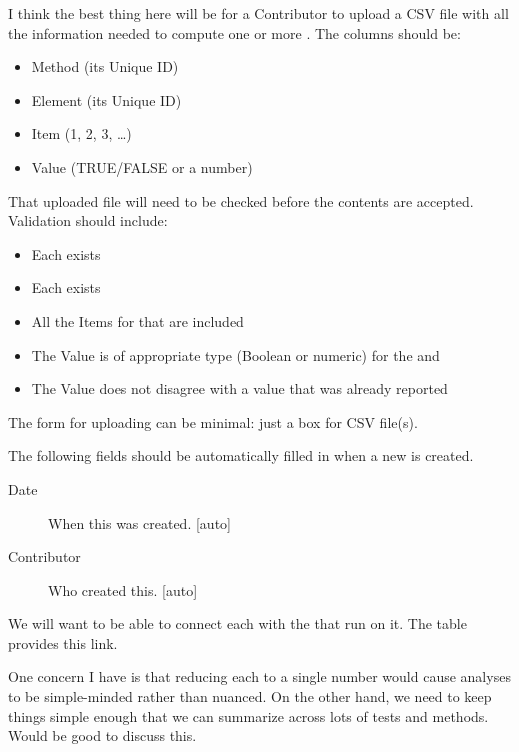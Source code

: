 I think the best thing here will be for a Contributor to upload a CSV file with all the information needed to compute one or more \Results.
The columns should be:
\begin{itemize}
    \item Method (its Unique ID)
    \item Element (its Unique ID)
    \item Item (1, 2, 3, \ldots)
    \item Value (TRUE/FALSE or a number)
\end{itemize}

That uploaded file will need to be checked before the contents are accepted.  Validation should include:
\begin{itemize}
    \item Each \Method exists
    \item Each \Element exists
    \item All the Items for that \Element are included
    \item The Value is of appropriate type (Boolean or numeric) for the \Method and \Task
    \item The Value does not disagree with a value that was already reported
\end{itemize}

The form for uploading \Results can be minimal: just a box for CSV file(s).

The following fields should be automatically filled in when a new \Result is created.
\begin{description}
    \item[Date] When this was created. [auto]
    \item[Contributor] Who created this. [auto]
\end{description}

We will want to be able to connect each \Element with the \Methods that run on it.
The \Results table provides this link.

One concern I have is that reducing each \Result to a single number would cause analyses to be simple-minded rather than nuanced.
On the other hand, we need to keep things simple enough that we can summarize across lots of tests and methods.
Would be good to discuss this.

